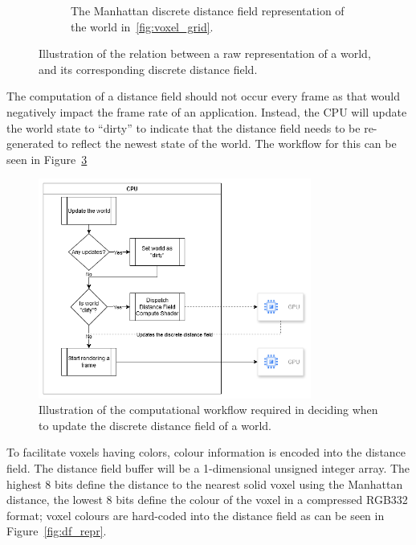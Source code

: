 \begin{figure}[htbp]
\begin{subfigure}{0.49\textwidth}
    \caption{The Manhattan discrete distance field representation of the world in~\ref{fig:voxel_grid}.}
    \label{fig:voxel_grid_df}
  \end{subfigure}
  \caption{Illustration of the relation between a raw representation of a world, and its corresponding discrete
    distance field.}
  \label{fig:voxel_grid_df_rel}
\end{figure}

The computation of a distance field should not occur every frame as that would negatively impact the frame rate of an
application. Instead, the CPU will update the world state to ``dirty'' to indicate that the distance field needs to be
re-generated to reflect the newest state of the world. The workflow for this can be seen in Figure~\ref{fig:df_update_proc}

\begin{figure}[htbp]
  \centering
  \includegraphics[width=0.8\textwidth]{figures/df_update_proc.drawio.png}
  \caption{Illustration of the computational workflow required in deciding when to update the discrete distance field
    of a world.}
  \label{fig:df_update_proc}
\end{figure}

To facilitate voxels having colors, colour information is encoded into the distance field. The distance field buffer
will be a 1-dimensional unsigned integer array. The highest 8 bits define the distance to the nearest solid voxel using
the Manhattan distance, the lowest 8 bits define the colour of the voxel in a compressed RGB332 format; voxel colours
are hard-coded into the distance field as can be seen in Figure~\ref{fig:df_repr}.


